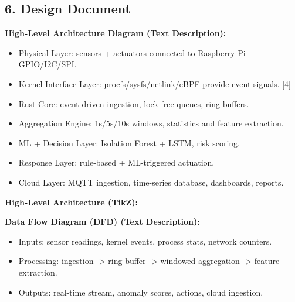\documentclass[11pt]{article}
\begin{document}
\subsection{6. Design Document}
\textbf{High-Level Architecture Diagram (Text Description):}
\begin{itemize}
    \item Physical Layer: sensors + actuators connected to Raspberry Pi GPIO/I2C/SPI.
    \item Kernel Interface Layer: procfs/sysfs/netlink/eBPF provide event signals. [4]
    \item Rust Core: event-driven ingestion, lock-free queues, ring buffers.
    \item Aggregation Engine: 1s/5s/10s windows, statistics and feature extraction.
    \item ML + Decision Layer: Isolation Forest + LSTM, risk scoring.
    \item Response Layer: rule-based + ML-triggered actuation.
    \item Cloud Layer: MQTT ingestion, time-series database, dashboards, reports.
\end{itemize}

\textbf{High-Level Architecture (TikZ):}
\begin{center}
\end{center}

\textbf{Data Flow Diagram (DFD) (Text Description):}
\begin{itemize}
    \item Inputs: sensor readings, kernel events, process stats, network counters.
    \item Processing: ingestion -> ring buffer -> windowed aggregation -> feature extraction.
    \item Outputs: real-time stream, anomaly scores, actions, cloud ingestion.
\end{itemize}
\end{document}
